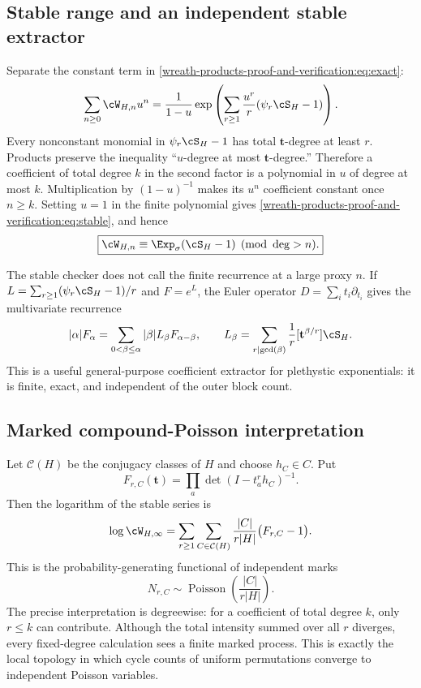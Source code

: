 \documentclass[10pt]{article}
\begin{document}
\subsection{Stable range and an independent stable extractor}
Separate the constant term in \eqref{wreath-products-proof-and-verification:eq:exact}:
\[
 \sum_{n\ge0}\cW_{H,n}u^n
 =\frac1{1-u}\exp\left(\sum_{r\ge1}\frac{u^r}{r}
 (\psi_r\cS_H-1)\right).
\]
\newpage
Every nonconstant monomial in $\psi_r\cS_H-1$ has total $\mathbf t$-degree
at least $r$.  Products preserve the inequality ``$u$-degree at most
$\mathbf t$-degree.''  Therefore a coefficient of total degree $k$ in the
second factor is a polynomial in $u$ of degree at most $k$.  Multiplication
by $(1-u)^{-1}$ makes its $u^n$ coefficient constant once $n\ge k$.  Setting
$u=1$ in the finite polynomial gives \eqref{wreath-products-proof-and-verification:eq:stable}, and hence
\[
 \boxed{\cW_{H,n}\equiv\Exp_\sigma(\cS_H-1)\pmod{\deg>n}.}
\]

The stable checker does not call the finite recurrence at a large proxy
$n$.  If $L=\sum_{r\ge1}(\psi_r\cS_H-1)/r$ and $F=e^L$, the Euler operator
$D=\sum_i t_i\partial_{t_i}$ gives the multivariate recurrence
\begin{equation}\label{wreath-products-proof-and-verification:eq:stable-recurrence}
 |\alpha|F_\alpha=
 \sum_{0<\beta\le\alpha}|\beta|L_\beta F_{\alpha-\beta},
 \qquad
 L_\beta=\sum_{r\mid\gcd(\beta)}\frac1r
 [\mathbf t^{\beta/r}]\cS_H.
\end{equation}
This is a useful general-purpose coefficient extractor for plethystic
exponentials: it is finite, exact, and independent of the outer block count.

\subsection{Marked compound-Poisson interpretation}
Let $\mathcal C(H)$ be the conjugacy classes of $H$ and choose $h_C\in C$.
Put
\[
 F_{r,C}(\mathbf t)=\prod_a\det(I-t_a^rh_C)^{-1}.
\]
Then the logarithm of the stable series is
\[
 \log\cW_{H,\infty}=
 \sum_{r\ge1}\sum_{C\in\mathcal C(H)}
 \frac{|C|}{r|H|}\bigl(F_{r,C}-1\bigr).
\]
This is the probability-generating functional of independent marks
\[
 N_{r,C}\sim\operatorname{Poisson}\left(\frac{|C|}{r|H|}\right).
\]
The precise interpretation is degreewise: for a coefficient of total degree
$k$, only $r\le k$ can contribute.  Although the total intensity summed over
all $r$ diverges, every fixed-degree calculation sees a finite marked process.
This is exactly the local topology in which cycle counts of uniform
permutations converge to independent Poisson variables.
\end{document}
